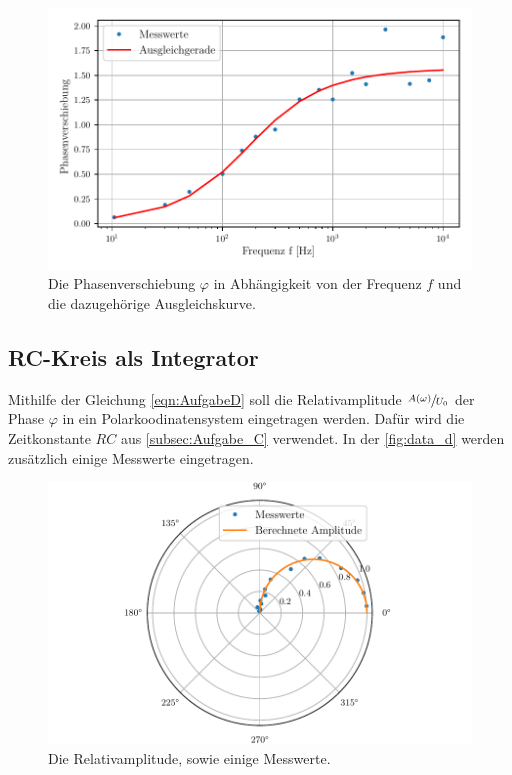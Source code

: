 \begin{figure}
  \centering
  \includegraphics{content/data_c_ausgleich.pdf}
  \caption{Die Phasenverschiebung $\varphi$ in Abhängigkeit von der Frequenz $f$ und die dazugehörige Ausgleichskurve.}
  \label{fig:data_c}
\end{figure}

\subsection{RC-Kreis als Integrator}
\label{Aufgabe_d}
Mithilfe der Gleichung \eqref{eqn:AufgabeD} soll die Relativamplitude $\sfrac{A(\omega)}{U_0}$ der Phase $\varphi$ in ein Polarkoodinatensystem eingetragen werden.
Dafür wird die Zeitkonstante $RC$ aus \autoref{subsec:Aufgabe_C} verwendet.
In der \autoref{fig:data_d} werden zusätzlich einige Messwerte eingetragen.

\begin{figure}
  \centering
  \includegraphics{content/data_d_ausgleich.pdf}
  \caption{Die Relativamplitude, sowie einige Messwerte.}
  \label{fig:data_d}
\end{figure}
%
%
%
%
%
%
%